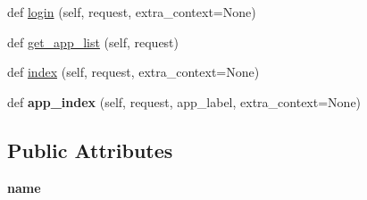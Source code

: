 \begin{DoxyCompactItemize}
\item 
def \mbox{\hyperlink{classdjango_1_1contrib_1_1admin_1_1sites_1_1_admin_site_a082ff3962c1de33df9c12d5b1bfa732d}{login}} (self, request, extra\+\_\+context=None)
\item 
def \mbox{\hyperlink{classdjango_1_1contrib_1_1admin_1_1sites_1_1_admin_site_aaa5c674a03b5aa9795ffc15af2c041c1}{get\+\_\+app\+\_\+list}} (self, request)
\item 
def \mbox{\hyperlink{classdjango_1_1contrib_1_1admin_1_1sites_1_1_admin_site_a114200436dcab5d292516d7454298630}{index}} (self, request, extra\+\_\+context=None)
\item 
\mbox{\label{classdjango_1_1contrib_1_1admin_1_1sites_1_1_admin_site_a1c329c7dd05218fa3d37faabccd0c7dc}} 
def {\bfseries app\+\_\+index} (self, request, app\+\_\+label, extra\+\_\+context=None)
\end{DoxyCompactItemize}
\subsection*{Public Attributes}
\begin{DoxyCompactItemize}
\item 
\mbox{\label{classdjango_1_1contrib_1_1admin_1_1sites_1_1_admin_site_a4ab2718948015f11fb5a94a40b61a559}} 
{\bfseries name}
\end{DoxyCompactItemize}
